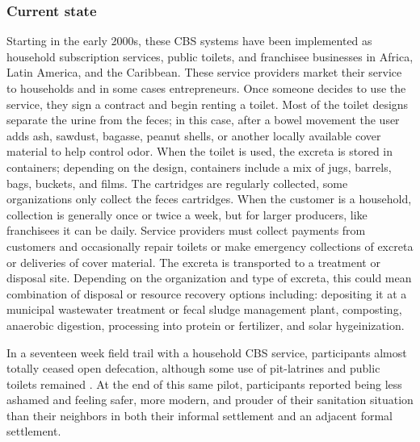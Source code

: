 \documentclass[sustainability,article,submit,moreauthors,pdftex,10pt,a4paper]{mdpi}
\theoremstyle{mdpi}
\newcounter{ex}
\newcounter{re}
\theoremstyle{mdpidefinition}
\begin{document}
\subsubsection{Current state}

Starting in the early 2000s, these CBS systems have been implemented as household subscription services, public toilets, and franchisee businesses in Africa, Latin America, and the Caribbean. These service providers market their service to households and in some cases entrepreneurs. Once someone decides to use the service, they sign a contract and begin renting a toilet. Most of the toilet designs separate the urine from the feces; in this case, after a bowel movement the user adds ash, sawdust, bagasse, peanut shells, or another locally available cover material to help control odor. When the toilet is used, the excreta is stored in containers; depending on the design, containers include a mix of jugs, barrels, bags, buckets, and films. The cartridges are regularly collected, some organizations only collect the feces cartridges. When the customer is a household, collection is generally once or twice a week, but for larger producers, like franchisees it can be daily. Service providers must collect payments from customers and occasionally repair toilets or make emergency collections of excreta or deliveries of cover material. The excreta is transported to a treatment or disposal site. Depending on the organization and type of excreta, this could mean combination of disposal or resource recovery options including: depositing it at a municipal wastewater treatment or fecal sludge management plant, composting, anaerobic digestion, processing into protein or fertilizer, and solar hygeinization. 


In a seventeen week field trail with a household CBS service, participants almost totally ceased open defecation, although some use of pit-latrines and public toilets remained \cite{Tilmans2015}. At the end of this same pilot, participants reported being less ashamed and feeling safer, more modern, and prouder of their sanitation situation than their neighbors in both their informal settlement and an adjacent formal settlement\cite{Russel2015}.

% 
% 
\end{document}
